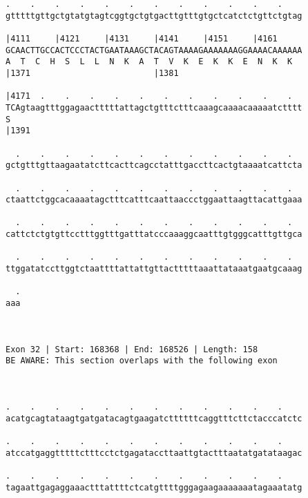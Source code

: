 \documentclass{article}
\begin{document}
\begin{Verbatim}
.    .    .    .    .    .    .    .    .    .    .    .    
gtttttgttgctgtatgtagtcggtgctgtgacttgtttgtgctcatctctgttctgtag
                                                            
|4111     |4121     |4131     |4141     |4151     |4161     
GCAACTTGCCACTCCCTACTGAATAAAGCTACAGTAAAAGAAAAAAAGGAAAACAAAAAA
A  T  C  H  S  L  L  N  K  A  T  V  K  E  K  K  E  N  K  K  
|1371                         |1381                         
  
|4171  .    .    .    .    .    .    .    .    .    .    .  
TCAgtaagtttggagaactttttattagctgtttctttcaaagcaaaacaaaaatctttt
S                                                           
|1391                                                       
  
  .    .    .    .    .    .    .    .    .    .    .    .  
gctgtttgttaagaatatcttcacttcagcctatttgaccttcactgtaaaatcattcta
                                                            
  .    .    .    .    .    .    .    .    .    .    .    .  
ctaattctggcacaaaatagctttcatttcaattaaccctggaattaagttacattgaaa
                                                            
  .    .    .    .    .    .    .    .    .    .    .    .  
cattctctgtgttcctttggtttgatttatcccaaaggcaatttgtgggcatttgttgca
                                                            
  .    .    .    .    .    .    .    .    .    .    .    .  
ttggatatccttggtctaattttattattgttactttttaaattataaatgaatgcaaag
                                                            
  .
aaa
   
   
 
Exon 32 | Start: 168368 | End: 168526 | Length: 158
BE AWARE: This section overlaps with the following exon



.    .    .    .    .    .    .    .    .    .    .    .    
acatgcagtataagtgatgatacagtgaagatcttttttcaggtttcttctacccatctc
                                                            
.    .    .    .    .    .    .    .    .    .    .    .    
atccatgaggtttttctttcctctgagataccttaattgtactttaatatgatataagac
                                                            
.    .    .    .    .    .    .    .    .    .    .    .    
tagaattgagaggaaactttattttctcatgttttgggagaagaaaaaaatagaaatatg
                                                            

\end{Verbatim}
\end{document}
